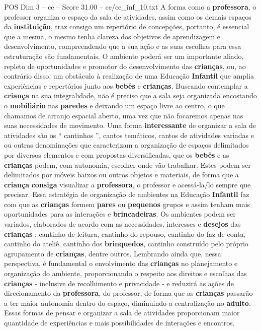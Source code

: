 \begin{textsample}{POS Dim 3 – ce – Score 31.00 – ce/ce\_inf\_10.txt}
A forma como a \textbf{professora}, o professor organiza o espaço da sala de atividades, assim como os demais espaços da \textbf{instituição}, traz consigo um repertório de concepções, portanto, é essencial que a mesma, o mesmo tenha clareza dos objetivos de aprendizagem e desenvolvimento, compreendendo que a sua ação e as suas escolhas para essa estruturação são fundamentais.
O ambiente poderá ser um importante aliado, repleto de oportunidades e promotor do desenvolvimento das \textbf{crianças}, ou, ao contrário disso, um obstáculo à realização de uma Educação \textbf{Infantil} que amplia experiências e repertórios junto aos \textbf{bebês} e \textbf{crianças}.
Buscando contemplar a \textbf{criança} na sua integralidade, não é preciso que a sala seja organizada encostando o \textbf{mobiliário} nas \textbf{paredes} e deixando um espaço livre ao centro, o que chamamos de arranjo espacial aberto, uma vez que não focaremos apenas nas suas necessidades de movimento.
Uma forma \textbf{interessante} de organizar a sala de atividades são os “ cantinhos ”, cantos temáticos, cantos de atividades variadas e ou outras denominações que caracterizam a organização de espaços delimitados por diversos elementos e com propostas diversificadas, que os \textbf{bebês} e as \textbf{crianças} podem, com autonomia, escolher onde vão trabalhar.
Estes podem ser delimitados por móveis baixos ou outros objetos e materiais, de forma que a \textbf{criança} \textbf{consiga} visualizar a \textbf{professora}, o professor e acessá-la/lo sempre que precisar.
Essa estratégia de organização de ambientes na Educação \textbf{Infantil} faz com que as \textbf{crianças} formem \textbf{pares} ou \textbf{pequenos} grupos e assim tenham mais oportunidades para as interações e \textbf{brincadeiras}.
Os ambientes podem ser variados, elaborados de acordo com as necessidades, interesses e \textbf{desejos} das \textbf{crianças} : cantinho de leitura, cantinho do repouso, cantinho do faz de conta, cantinho do ateliê, cantinho dos \textbf{brinquedos}, cantinho construído pelo próprio agrupamento de \textbf{crianças}, dentre outros.
Lembrando ainda que, nessa perspectiva, é fundamental o envolvimento das \textbf{crianças} no planejamento e organização do ambiente, proporcionando o respeito aos direitos e escolhas das \textbf{crianças} - inclusive de recolhimento e privacidade - e reduzirá as ações de direcionamento da \textbf{professora}, do professor, de forma que as \textbf{crianças} passarão a ter maior autonomia dentro do espaço, diminuindo a centralização no \textbf{adulto}.
Essas formas de pensar e organizar a sala de atividades proporcionam maior quantidade de experiências e mais possibilidades de interações e encontros.

\end{textsample}
